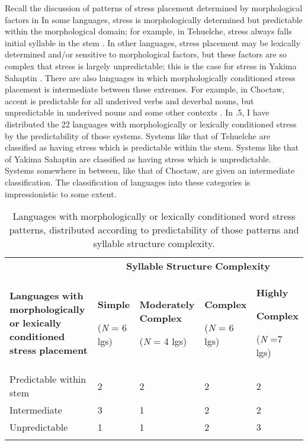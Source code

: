   Recall the discussion of patterns of stress placement determined by morphological factors in  In some languages, stress is morphologically determined but predictable within the morphological domain; for example, in Tehuelche, stress always falls initial syllable in the stem . In other languages, stress placement may be lexically determined and/or sensitive to morphological factors, but these factors are so complex that stress is largely unpredictable; this is the case for stress in Yakima Sahaptin . There are also languages in which morphologically conditioned stress placement is intermediate between these extremes. For example, in Choctaw, accent is predictable for all underived verbs and deverbal nouns, but unpredictable in underived nouns and some other contexts \citep{Broadwell2006}. In .5, I have distributed the 22 languages with morphologically or lexically conditioned stress by the predictability of those systems. Systems like that of Tehuelche are classified as having stress which is predictable within the stem. Systems like that of Yakima Sahaptin are classified as having stress which is unpredictable. Systems somewhere in between, like that of Choctaw, are given an intermediate classification. The classification of languages into these categories is impressionistic to some extent.

\begin{table}
\begin{tabularx}{\textwidth}{XXXXX}
\lsptoprule
 & \multicolumn{4}{c}{ \textbf{Syllable} \textbf{Structure} \textbf{Complexity}}\\
 \textbf{Languages} \textbf{with} \textbf{morphologically} \textbf{or} \textbf{lexically} \textbf{conditioned} \textbf{stress} \textbf{placement} & { \textbf{Simple}}

 (\textit{N} = 6 lgs) & { \textbf{Moderately} \textbf{Complex}}

 (\textit{N} = 4 lgs) & { \textbf{Complex}}

 (\textit{N} = 6 lgs) & { \textbf{Highly} }

{ \textbf{Complex}}

 (\textit{N} =7 lgs)\\
 Predictable within stem & 2 & 2 & 2 & 2\\
 Intermediate & 3 & 1 & 2 & 2\\
 Unpredictable & 1 & 1 & 2 & 3\\
\lspbottomrule
\end{tabularx}
\caption{\label{5.5}Languages with morphologically or lexically conditioned word stress patterns, distributed according to predictability of those patterns and syllable structure complexity.}
\end{table}

